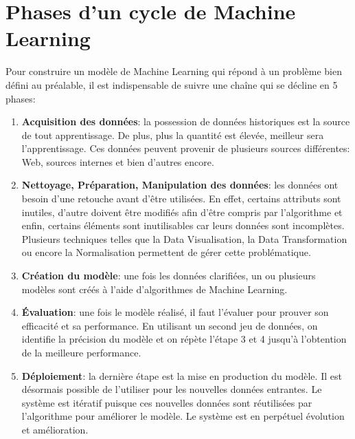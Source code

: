 \section{Phases d'un cycle de Machine Learning}
Pour construire un modèle de Machine Learning qui répond à un problème bien défini au préalable, il est indispensable de suivre une chaîne qui se décline en 5 phases:
    \begin{enumerate}
        \item \textbf{Acquisition des données}: la possession de données historiques est la source de tout apprentissage. De plus, plus la quantité est élevée, meilleur sera l’apprentissage. Ces données peuvent provenir de plusieurs sources différentes: Web, sources internes et bien d'autres encore.
        \item \textbf{Nettoyage, Préparation, Manipulation des données}: les données ont besoin d’une retouche avant d’être utilisées. En effet, certains attributs sont inutiles, d’autre doivent être modifiés afin d’être compris par l’algorithme et enfin, certains éléments sont inutilisables car leurs données sont incomplètes. Plusieurs techniques telles que la Data Visualisation, la Data Transformation ou encore la Normalisation permettent de gérer cette problématique.
        \item \textbf{Création du modèle}: une fois les données clarifiées, un ou plusieurs modèles sont créés à l’aide d’algorithmes de Machine Learning.
        \item \textbf{Évaluation}: une fois le modèle réalisé, il faut l’évaluer pour prouver son efficacité et sa performance. En utilisant un second jeu de données, on identifie la précision du modèle et on répète l’étape 3 et 4 jusqu’à l’obtention de la meilleure performance.
        \item \textbf{Déploiement}: la dernière étape est la mise en production du modèle. Il est désormais possible de l’utiliser pour les nouvelles données entrantes. Le système est itératif puisque ces nouvelles données sont réutilisées par l’algorithme pour améliorer le modèle. Le système est en perpétuel évolution et amélioration.
    \end{enumerate}